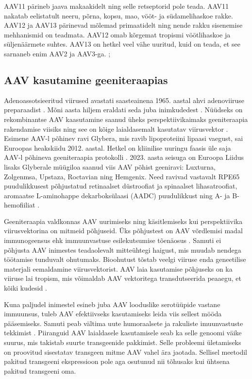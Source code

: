 \documentclass{trkut}%
\begin{document}
AAV11 pärineb jaava makaakidelt ning selle retseptorid pole teada. AAV11 nakatab eelistatult neeru, põrna, kopsu, mao, vööt- ja südamelihaskoe rakke. AAV12 ja AAV13 pärinevad mõlemad primaatidelt ning nende rakku sisenemise mehhanismid on teadmata. AAV12 omab kõrgemat tropismi vöötlihaskoe ja süljenäärmete suhtes. AAV13 on hetkel veel vähe uuritud, kuid on teada, et see sarnaneb enim AAV2 ja AAV3-ga. \parencite{pupo}; \parencite{serotüübid}

\subsection{AAV kasutamine geeniteraapias}

Adenoassotsieeritud viirused avastati saasteainena 1965. aastal ahvi adenoviiruse preparaadist \parencite{aav-avastamine}. Mõni aasta hiljem eraldati seda juba inimkudedest \parencite{aav-gen}. Nüüdseks on rekombinantse AAV kaasutamine saanud üheks perspektiivikaimaks geeniteraapia rakendamise viisiks ning see on kõige laialdasemalt kasutatav viirusvektor \parencite{aavlevinuim}. Esimene AAV-l põhinev ravi Glybera, mis ravib lipoproteiini lipaasi vaegust, sai Euroopas heakskiidu 2012. aastal. Hetkel on kliinilise uuringu faasis üle saja AAV-l põhineva geeniteraapia protokolli \parencite{who}. 2023. aasta seisuga on Euroopa Liidus lisaks Glyberale müügiloa saanud viis AAV põhist geeniravi: Luxturna, Zolgenmsa, Upstaza, Roctavian ning Hemgenix. Need ravivad vastavalt RPE65 puudulikkusest põhjustatud retinaalset düstroofiat ja spinaalset lihasatroofiat, aromaatse L-aminohappe dekarboksülaasi (AADC) puudulikkust ning A- ja B-hemofiiliat \parencite{ravimiamet}. 

Geeniteraapia valdkonnas AAV uurimiseks ning käsitlemiseks kui perspektiivika viirusvektorina on mitmeid põhjuseid. Üks põhjustest on AAV võrdlemisi madal immunogeensus ehk immuunvastuse esilekutsumise tõenäosus \parencite{pupo}. Samuti ei põhjusta AAV inimestes teadaolevalt mitteühtegi haigust, mis muudab nendega töötamise tunduvalt ohutumaks. Bioohutust tõstab veelgi viiruse enda geneetilise materjali eemaldamine viirusvektorist. \parencite{aav-gen} AAV laia kasutamise põhjuseks on ka viiruse lai tropism, mis võimaldab AAV vektoritega transdutseerida peaaegu, et kõiki kudesid \parencite{laitropism}.

Kuna paljudel inimestel esineb juba AAV looduslike serotüüpide vastane immuunsus, tuleb AAV efektiivseks kasutamiseks leida viis sellest mööda pääsemiseks. Samuti peab vältima uute humoraalsete ja rakuliste imuunvastuste tekkimist \parencite{pupo}. Piiranguid AAV laialdasele kasutamisele seab ka selle genoomi väike suurus, mis takistab suurte transgeenide pakkimist. Selle probleemi ületamiseks on proovitud sisestatav transgeen mitme AAV vahel ära jaotada. Sellisel meetodil pakitud transgeeni ekspressioon pole aga osutunud nii tõhusaks kui ühtsena pakitud transgeeni oma. \parencite{geenilõhkumine}
\end{document}
